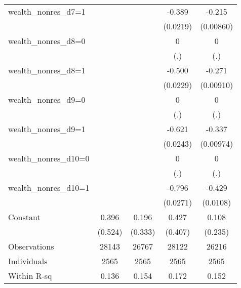 \begin{table}[htbp]
\begin{tabular}{l*{4}{c}}
wealth\_nonres\_d7=1&                  &                  &   -0.389\sym{***}&   -0.215\sym{***}\\
                &                  &                  & (0.0219)         &(0.00860)         \\
wealth\_nonres\_d8=0&                  &                  &        0         &        0         \\
                &                  &                  &      (.)         &      (.)         \\
wealth\_nonres\_d8=1&                  &                  &   -0.500\sym{***}&   -0.271\sym{***}\\
                &                  &                  & (0.0229)         &(0.00910)         \\
wealth\_nonres\_d9=0&                  &                  &        0         &        0         \\
                &                  &                  &      (.)         &      (.)         \\
wealth\_nonres\_d9=1&                  &                  &   -0.621\sym{***}&   -0.337\sym{***}\\
                &                  &                  & (0.0243)         &(0.00974)         \\
wealth\_nonres\_d10=0&                  &                  &        0         &        0         \\
                &                  &                  &      (.)         &      (.)         \\
wealth\_nonres\_d10=1&                  &                  &   -0.796\sym{***}&   -0.429\sym{***}\\
                &                  &                  & (0.0271)         & (0.0108)         \\
Constant        &    0.396         &    0.196         &    0.427         &    0.108         \\
                &  (0.524)         &  (0.333)         &  (0.407)         &  (0.235)         \\
\midrule
Observations    &    28143         &    26767         &    28122         &    26216         \\
Individuals     &     2565         &     2565         &     2565         &     2565         \\
Within R-sq     &    0.136         &    0.154         &    0.172         &    0.152         \\

\end{tabular}
\end{table}
